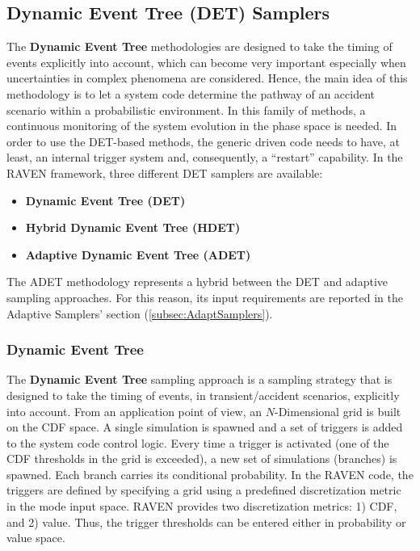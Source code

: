\subsection{Dynamic Event Tree (DET) Samplers}
\label{subsec:DETSamplers}
The \textbf{Dynamic Event Tree} methodologies are designed to take the timing of
events explicitly into account, which can become very important especially when
uncertainties in complex phenomena are considered.
%
Hence, the main idea of this methodology is to let a system code determine the
pathway of an accident scenario within a probabilistic environment.
%
In this family of methods, a continuous monitoring of the system evolution in
the phase space is needed.
%
In order to use the DET-based methods, the generic driven code needs to have, at
least, an internal trigger system and, consequently, a ``restart'' capability.
%
In the RAVEN framework, three different DET samplers are available:
\begin{itemize}
\item \textbf{Dynamic Event Tree (DET)}
\item \textbf{Hybrid Dynamic Event Tree (HDET)}
\item \textbf{Adaptive Dynamic Event Tree (ADET)}
\end{itemize}

The ADET methodology represents a hybrid between the DET and adaptive sampling
approaches.
%
For this reason, its input requirements are reported in the Adaptive Samplers'
section (\ref{subsec:AdaptSamplers}).

\subsubsection{Dynamic Event Tree}
\label{subsubsubsec:DET}
The \textbf{Dynamic Event Tree} sampling approach is a sampling strategy that is
designed to take the timing of events, in transient/accident scenarios,
explicitly into account.
%
From an application point of view, an $N$-Dimensional grid is built on the CDF
space.
%
A single simulation is spawned and a set of triggers is added to the system code
control logic.
%
Every time a trigger is activated (one of the CDF thresholds in the grid is
exceeded), a new set of simulations (branches) is spawned.
%
Each branch carries its conditional probability.
%
In the RAVEN code, the triggers are defined by specifying a grid using a
predefined discretization metric in the mode input space.
%
RAVEN provides two discretization metrics: 1) CDF, and 2) value.
%
Thus, the trigger thresholds can be entered either in probability or value
space.
%

